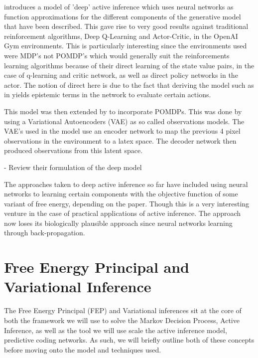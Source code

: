 \documentclass{article}
\begin{document}
\vspace{1em}

\citep{millidge2020deep} introduces a model of 'deep' active inference which uses neural networks as function approximations for the different components of the generative model that have been described. This gave rise to very good results against traditional reinforcement algorithms, Deep Q-Learning and Actor-Critic, in the OpenAI Gym environments. This is particularly interesting since the environments used were MDP's not POMDP's which would generally suit the reinforcements learning algorithms because of their direct learning of the state value pairs, in the case of q-learning and critic network, as well as direct policy networks in the actor. The notion of direct here is due to the fact that deriving the model such as in \citep{millidge2020deep} yields epistemic terms in the network to evaluate certain actions.

This model was then extended by \citet{himst2020deep} to incorporate POMDPs. This was done by using a Variational Autoencoders (VAE) as so called observations models. The VAE's used in the model use an encoder network to map the previous 4 pixel observations in the environment to a latex space. The decoder network then produced observations from this latent space. 

\citet{fountas2020deep} - Review their formulation of the deep model

The approaches taken to deep active inference so far have included using neural networks to learning certain components with the objective function of some variant of free energy, depending on the paper. Though this is a very interesting venture in the case of practical applications of active inference. The approach now loses its biologically plausible approach since neural networks learning through back-propagation. 

\section{Free Energy Principal and Variational Inference}

The Free Energy Principal (FEP) and Variational inferences sit at the core of both the framework we will use to solve the Markov Decision Process, Active Inference, as well as the tool we will use scale the active inference model, predictive coding networks. As such, we will briefly outline both of these concepts before moving onto the model and techniques used. 
\end{document}
